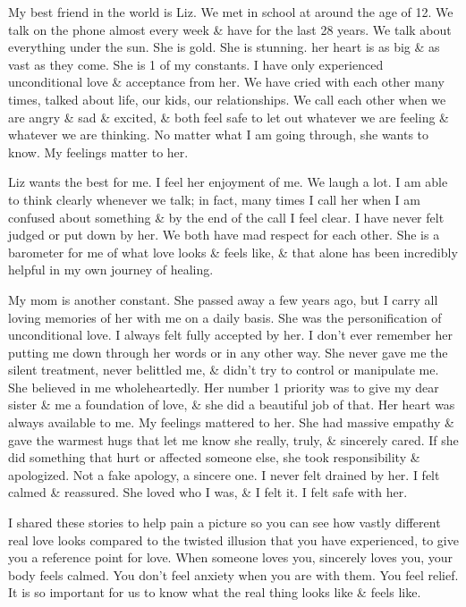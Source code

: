 \documentclass{article}
\numberwithin{equation}{section}
\begin{document}
My best friend in the world is Liz. We met in school at around the age of 12. We talk on the phone almost every week \& have for the last 28 years. We talk about everything under the sun. She is gold. She is stunning. her heart is as big \& as vast as they come. She is 1 of my constants. I have only experienced unconditional love \& acceptance from her. We have cried with each other many times, talked about life, our kids, our relationships. We call each other when we are angry \& sad \& excited, \& both feel safe to let out whatever we are feeling \& whatever we are thinking. No matter what I am going through, she wants to know. My feelings matter to her.

Liz wants the best for me. I feel her enjoyment of me. We laugh a lot. I am able to think clearly whenever we talk; in fact, many times I call her when I am confused about something \& by the end of the call I feel clear. I have never felt judged or put down by her. We both have mad respect for each other. She is a barometer for me of what love looks \& feels like, \& that alone has been incredibly helpful in my own journey of healing.

My mom is another constant. She passed away a few years ago, but I carry all loving memories of her with me on a daily basis. She was the personification of unconditional love. I always felt fully accepted by her. I don't ever remember her putting me down through her words or in any other way. She never gave me the silent treatment, never belittled me, \& didn't try to control or manipulate me. She believed in me wholeheartedly. Her number 1 priority was to give my dear sister \& me a foundation of love, \& she did a beautiful job of that. Her heart was always available to me. My feelings mattered to her. She had massive empathy \& gave the warmest hugs that let me know she really, truly, \& sincerely cared. If she did something that hurt or affected someone else, she took responsibility \& apologized. Not a fake apology, a sincere one. I never felt drained by her. I felt calmed \& reassured. She loved who I was, \& I felt it. I felt safe with her.

I shared these stories to help pain a picture so you can see how vastly different real love looks compared to the twisted illusion that you have experienced, to give you a reference point for love. When someone loves you, sincerely loves you, your body feels calmed. You don't feel anxiety when you are with them. You feel relief. It is so important for us to know what the real thing looks like \& feels like.
\end{document}
